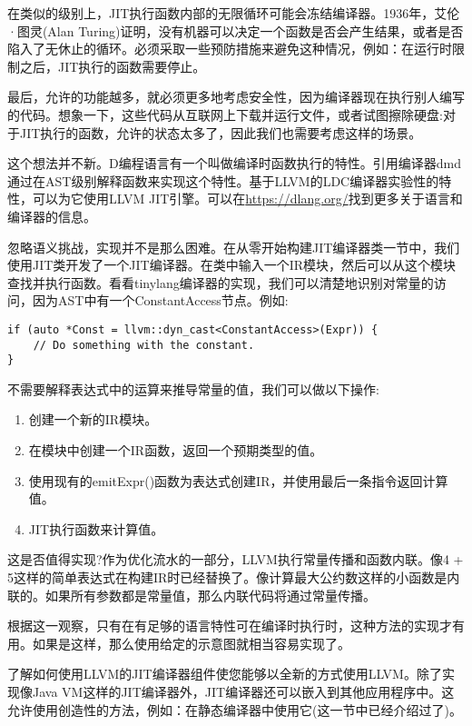 在类似的级别上，JIT执行函数内部的无限循环可能会冻结编译器。1936年，艾伦·图灵(Alan Turing)证明，没有机器可以决定一个函数是否会产生结果，或者是否陷入了无休止的循环。必须采取一些预防措施来避免这种情况，例如：在运行时限制之后，JIT执行的函数需要停止。\par

最后，允许的功能越多，就必须更多地考虑安全性，因为编译器现在执行别人编写的代码。想象一下，这些代码从互联网上下载并运行文件，或者试图擦除硬盘:对于JIT执行的函数，允许的状态太多了，因此我们也需要考虑这样的场景。\par

这个想法并不新。D编程语言有一个叫做编译时函数执行的特性。引用编译器dmd通过在AST级别解释函数来实现这个特性。基于LLVM的LDC编译器实验性的特性，可以为它使用LLVM JIT引擎。可以在\url{https://dlang.org/}找到更多关于语言和编译器的信息。\par

忽略语义挑战，实现并不是那么困难。在从零开始构建JIT编译器类一节中，我们使用JIT类开发了一个JIT编译器。在类中输入一个IR模块，然后可以从这个模块查找并执行函数。看看tinylang编译器的实现，我们可以清楚地识别对常量的访问，因为AST中有一个ConstantAccess节点。例如:\par

\begin{lstlisting}[caption={}]
if (auto *Const = llvm::dyn_cast<ConstantAccess>(Expr)) {
	// Do something with the constant.
}
\end{lstlisting}

不需要解释表达式中的运算来推导常量的值，我们可以做以下操作:\par

\begin{enumerate}
\item 创建一个新的IR模块。

\item 在模块中创建一个IR函数，返回一个预期类型的值。

\item 使用现有的emitExpr()函数为表达式创建IR，并使用最后一条指令返回计算值。

\item JIT执行函数来计算值。
\end{enumerate}

这是否值得实现?作为优化流水的一部分，LLVM执行常量传播和函数内联。像4 + 5这样的简单表达式在构建IR时已经替换了。像计算最大公约数这样的小函数是内联的。如果所有参数都是常量值，那么内联代码将通过常量传播。\par

根据这一观察，只有在有足够的语言特性可在编译时执行时，这种方法的实现才有用。如果是这样，那么使用给定的示意图就相当容易实现了。\par

了解如何使用LLVM的JIT编译器组件使您能够以全新的方式使用LLVM。除了实现像Java VM这样的JIT编译器外，JIT编译器还可以嵌入到其他应用程序中。这允许使用创造性的方法，例如：在静态编译器中使用它(这一节中已经介绍过了)。\par





















